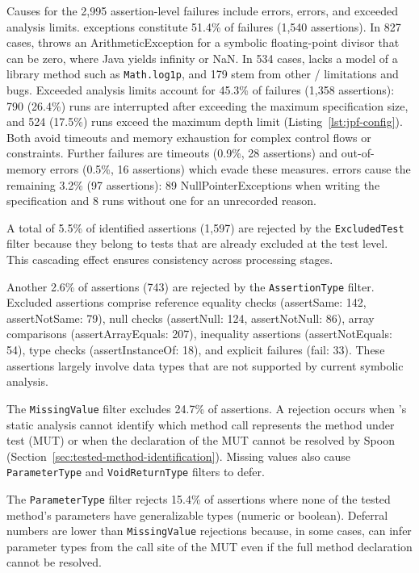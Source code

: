Causes for the 2,995 assertion-level failures include \ToolSPF{} errors, \ToolTeralizer{} errors,
and exceeded analysis limits.
\ToolSPF{} exceptions constitute 51.4\% of failures (1,540 assertions).
In 827 cases, \ToolSPF{} throws an ArithmeticException for a symbolic floating-point divisor
that can be zero, where Java yields infinity or NaN.
In 534 cases, \ToolJPF{} lacks a model of a library method such as \texttt{Math.log1p},
and 179 stem from other \ToolSPF{}/\ToolJPF{} limitations and bugs.
Exceeded analysis limits account for 45.3\%
of failures (1,358 assertions):
790 (26.4\%) \ToolSPF{} runs are interrupted
after exceeding the maximum specification size,
and 524 (17.5\%) runs exceed the maximum depth limit
(Listing~\ref{lst:jpf-config}).
Both avoid timeouts and memory exhaustion
for complex control flows or constraints.
Further failures are timeouts (0.9\%, 28 assertions)
and out-of-memory errors (0.5\%, 16 assertions)
which evade these measures.
\ToolTeralizer{} errors cause the remaining 3.2\% (97 assertions):
89 NullPointerExceptions when writing the specification
and 8 runs without one for an unrecorded reason.

A total of 5.5\% of identified assertions (1,597) are rejected by the \texttt{ExcludedTest} filter
because they belong to tests that are already excluded at the test level.
This cascading effect ensures consistency across processing stages.

Another 2.6\% of assertions (743) are rejected by the \texttt{AssertionType} filter.
Excluded assertions comprise
reference equality checks (assertSame: 142, assertNotSame: 79),
null checks (assertNull: 124, assertNotNull: 86),
array comparisons (assertArrayEquals: 207),
inequality assertions (assertNotEquals: 54),
type checks (assertInstanceOf: 18),
and explicit failures (fail: 33).
These assertions largely involve data types
that are not supported by current symbolic analysis.

The \texttt{MissingValue} filter excludes 24.7\% of assertions.
A rejection occurs when \ToolTeralizer{}'s static analysis
cannot identify which method call represents the method under test (MUT)
or when the declaration of the MUT cannot be
resolved by Spoon (Section~\ref{sec:tested-method-identification}).
Missing values also cause \texttt{ParameterType} and \texttt{VoidReturnType} filters to defer.

The \texttt{ParameterType} filter rejects 15.4\% of assertions
where none of the tested method's parameters
have generalizable types (numeric or boolean).
Deferral numbers are lower than \texttt{MissingValue} rejections
because, in some cases, \ToolTeralizer{} can infer parameter types from the call site
of the MUT even if the full method declaration cannot be resolved.

